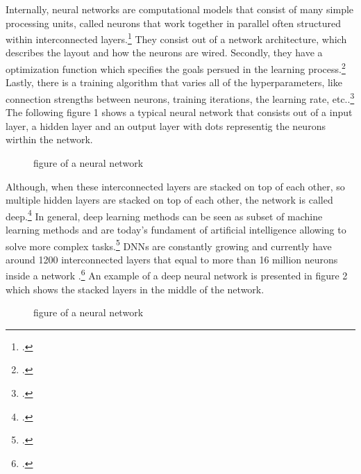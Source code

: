 Internally, neural networks are computational models that consist of many simple processing units, called neurons that work together in parallel often structured within interconnected layers.\footcite[cf.][305]{cichyDeepNeuralNetworks2019}
They consist out of a network architecture, which describes the layout and how the neurons are wired. Secondly, they have a optimization function which specifies the goals persued in the learning process.\footcite[cf.][1583]{durstewitzDeepNeuralNetworks2019}
Lastly, there is a training algorithm that varies all of the hyperparameters, like connection strengths between neurons, training iterations, the learning rate, etc..\footcite[cf.][1583]{durstewitzDeepNeuralNetworks2019}
The following figure 1 shows a typical neural network that consists out of a input layer, a hidden layer and an output layer with dots representig the neurons wirthin the network.
\begin{figure}[H]
    \centering
    \caption{figure of a neural network}
\end{figure}
Although, when these interconnected layers are stacked on top of each other, so multiple hidden layers are stacked on top of each other, the network is called deep.\footcite[cf.][305]{cichyDeepNeuralNetworks2019}
In general, deep learning methods can be seen as subset of machine learning methods and are today's fundament of artificial intelligence allowing to solve more complex tasks.\footcite[cf.][1583]{durstewitzDeepNeuralNetworks2019}
\ac{DNN}s are constantly growing and currently have around 1200 interconnected layers that equal to more than 16 million neurons inside a network .\footcite[cf.][2]{mallComprehensiveReviewDeep2023}
An example of a deep neural network is presented in figure 2 which shows the stacked layers in the middle of the network.
\begin{figure}[H]
    \centering
    \caption{figure of a neural network}
\end{figure}


